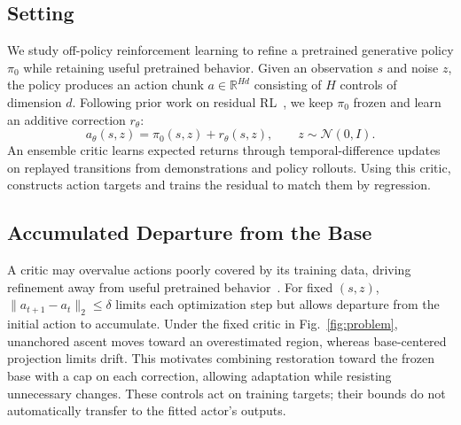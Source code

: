 \subsection{Setting}
We study off-policy reinforcement learning to refine a pretrained generative policy $\pi_0$ while retaining useful pretrained behavior. 
Given an observation $s$ and noise $z$, the policy produces an action chunk $a\in\mathbb{R}^{Hd}$ consisting of $H$ controls of dimension $d$. 
Following prior work on residual RL~\cite{johannink2019residual,ankile2025resfit,dicerl2026}, we keep $\pi_0$ frozen and learn an additive correction $r_\theta$:
\begin{equation}
  a_\theta(s,z)=\pi_0(s,z)+r_\theta(s,z),
  \qquad z\sim\mathcal{N}(0,I).
  \label{eq:residual}
\end{equation}
An ensemble critic learns expected returns through temporal-difference updates on replayed transitions from demonstrations and policy rollouts. 
Using this critic, \method{} constructs action targets and trains the residual to match them by regression.

\subsection{Accumulated Departure from the Base}
A critic may overvalue actions poorly covered by its training data, driving refinement away from useful pretrained behavior~\cite{fujimoto2019bcq}. For fixed $(s,z)$, $\|a_{t+1}-a_t\|_2\leq\delta$ limits each optimization step but allows departure from the initial action to accumulate. Under the fixed critic in Fig.~\ref{fig:problem}, unanchored ascent moves toward an overestimated region, whereas base-centered projection limits drift. This motivates combining restoration toward the frozen base with a cap on each correction, allowing adaptation while resisting unnecessary changes. These controls act on training targets; their bounds do not automatically transfer to the fitted actor's outputs.


